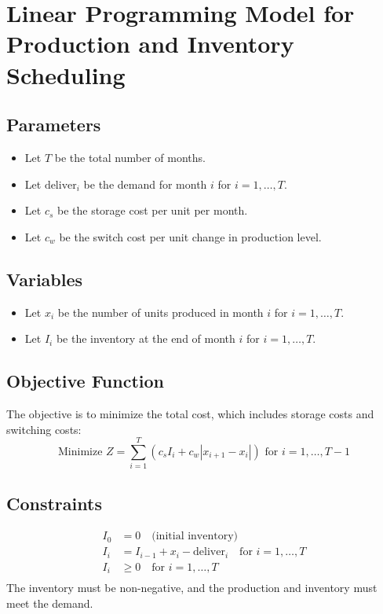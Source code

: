 \documentclass{article}
\begin{document}
\section*{Linear Programming Model for Production and Inventory Scheduling}

\subsection*{Parameters}
\begin{itemize}
    \item Let \( T \) be the total number of months.
    \item Let \( \text{deliver}_i \) be the demand for month \( i \) for \( i = 1, \ldots, T \).
    \item Let \( c_s \) be the storage cost per unit per month.
    \item Let \( c_w \) be the switch cost per unit change in production level.
\end{itemize}

\subsection*{Variables}
\begin{itemize}
    \item Let \( x_i \) be the number of units produced in month \( i \) for \( i = 1, \ldots, T \).
    \item Let \( I_i \) be the inventory at the end of month \( i \) for \( i = 1, \ldots, T \).
\end{itemize}

\subsection*{Objective Function}
The objective is to minimize the total cost, which includes storage costs and switching costs:
\[
\text{Minimize } Z = \sum_{i=1}^{T} (c_s I_i + c_w |x_{i+1} - x_i|) \text{ for } i = 1, \ldots, T-1
\]

\subsection*{Constraints}
\begin{align*}
    I_0 & = 0 \quad \text{(initial inventory)} \\
    I_i & = I_{i-1} + x_i - \text{deliver}_i \quad \text{for } i = 1, \ldots, T \\
    I_i & \geq 0 \quad \text{for } i = 1, \ldots, T \\
\end{align*}
The inventory must be non-negative, and the production and inventory must meet the demand.
\end{document}
